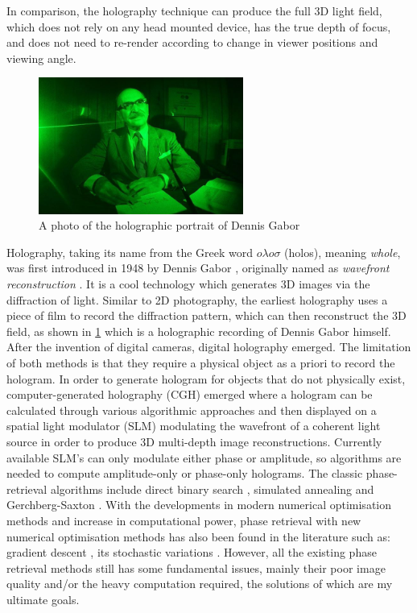In comparison, the holography technique can produce the full 3D light field, which does not rely on any head mounted device, has the true depth of focus, and does not need to re-render according to change in viewer positions and viewing angle.

\begin{figure}[H]
    \centering
    \includegraphics[width=0.6\textwidth]{Dennis-Gabor-Hologram-2.jpg}
    \caption{A photo of the holographic portrait of Dennis Gabor \cite{Lo2018}}\label{fig:Dennis-Gabor-Hologram-2}
\end{figure}

Holography, taking its name from the Greek word $o \lambda o \sigma $ (holos), meaning \textit{whole}, was first introduced in 1948 by Dennis Gabor \cite{Gabor1948}, originally named as \textit{wavefront reconstruction} \cite{Hecht2017}. It is a cool technology which generates 3D images via the diffraction of light. Similar to 2D photography, the earliest holography uses a piece of film to record the diffraction pattern, which can then reconstruct the 3D field, as shown in \cref{fig:Dennis-Gabor-Hologram-2} which is a holographic recording of Dennis Gabor himself. After the invention of digital cameras, digital holography emerged. The limitation of both methods is that they require a physical object as a priori to record the hologram. In order to generate hologram for objects that do not physically exist, computer-generated holography (CGH) emerged where a hologram can be calculated through various algorithmic approaches and then displayed on a spatial light modulator (SLM) modulating the wavefront of a coherent light source in order to produce 3D multi-depth image reconstructions. Currently available SLM's can only modulate either phase or amplitude, so algorithms are needed to compute amplitude-only or phase-only holograms. The classic phase-retrieval algorithms include direct binary search \cite{Seldowitz1987}, simulated annealing \cite{Kirkpatrick1983} and Gerchberg-Saxton \cite{Gerchberg1972}. With the developments in modern numerical optimisation methods and increase in computational power, phase retrieval with new numerical optimisation methods has also been found in the literature such as: gradient descent \cite{Zhang2017, Liu2020}, its stochastic variations \cite{Chen2021, Choi2021, Kadis2022}. However, all the existing phase retrieval methods still has some fundamental issues, mainly their poor image quality and/or the heavy computation required, the solutions of which are my ultimate goals.

